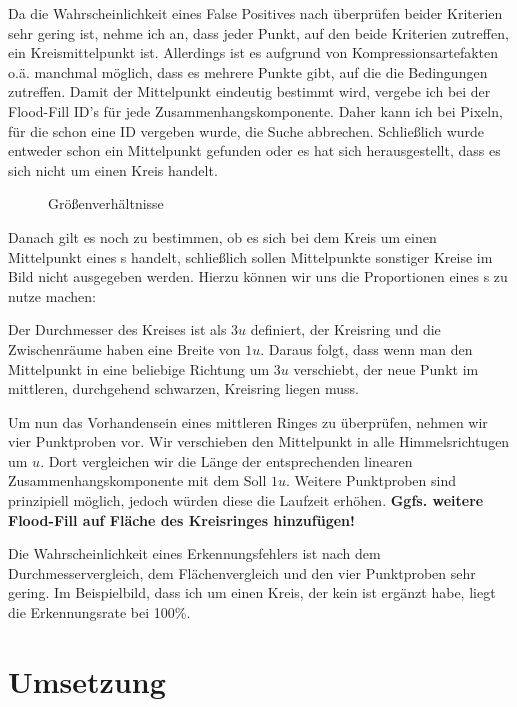 Da die Wahrscheinlichkeit eines False Positives nach überprüfen beider Kriterien sehr gering ist, nehme ich an, dass jeder Punkt, auf den beide Kriterien zutreffen, ein Kreismittelpunkt ist. Allerdings ist es aufgrund von Kompressionsartefakten o.ä. manchmal möglich, dass es mehrere Punkte gibt, auf die die Bedingungen zutreffen. Damit der Mittelpunkt eindeutig bestimmt wird, vergebe ich bei der Flood-Fill ID's für jede Zusammenhangskomponente. Daher kann ich bei Pixeln, für die schon eine ID vergeben wurde, die Suche abbrechen. Schließlich wurde entweder schon ein Mittelpunkt gefunden oder es hat sich herausgestellt, dass es sich nicht um einen Kreis handelt.

\begin{figure}
  \centering
  
  \caption{Größenverhältnisse}
  \label{abb:dims}
\end{figure}
Danach gilt es noch zu bestimmen, ob es sich bei dem Kreis um einen Mittelpunkt eines \task{}s handelt, schließlich sollen Mittelpunkte sonstiger Kreise im Bild nicht ausgegeben werden. Hierzu können wir uns die Proportionen eines \task{}s zu nutze machen:

Der Durchmesser des Kreises ist als \(3u\) definiert, der Kreisring und die Zwischenräume haben eine Breite von \(1u\). Daraus folgt, dass wenn man den Mittelpunkt in eine beliebige Richtung um \(3u\) verschiebt, der neue Punkt im mittleren, durchgehend schwarzen, Kreisring liegen muss.

Um nun das Vorhandensein eines mittleren Ringes zu überprüfen, nehmen wir vier Punktproben vor. Wir verschieben den Mittelpunkt in alle Himmelsrichtugen um \(u\). Dort vergleichen wir die Länge der entsprechenden linearen Zusammenhangskomponente mit dem Soll \(1u\). Weitere Punktproben sind prinzipiell möglich, jedoch würden diese die Laufzeit erhöhen. \textbf{Ggfs. weitere Flood-Fill auf Fläche des Kreisringes hinzufügen!}

Die Wahrscheinlichkeit eines Erkennungsfehlers ist nach dem Durchmesservergleich, dem Flächenvergleich und den vier Punktproben sehr gering. Im Beispielbild, dass ich um einen Kreis, der kein \task{} ist ergänzt habe, liegt die Erkennungsrate bei 100\%.

\pagebreak
\section{Umsetzung}

